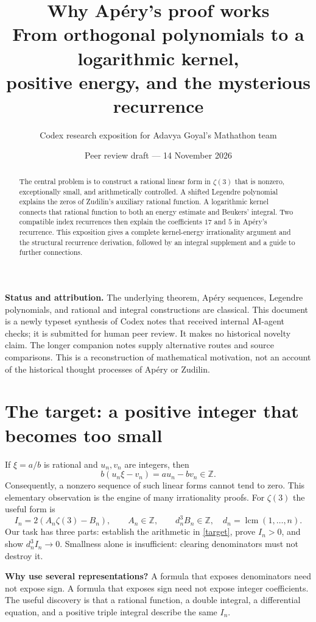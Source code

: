\documentclass[11pt]{article}
\title{Why Ap\'ery's proof works\\[3mm]\large From orthogonal polynomials to a logarithmic kernel,\\positive energy, and the mysterious recurrence}
\author{Codex research exposition for Adavya Goyal's Mathathon team}
\date{Peer review draft --- 14 November 2026}
\newcommand{\Z}{\mathbb Z}
\DeclareMathOperator{\lcm}{lcm}
\begin{document}
\maketitle
\begin{abstract}
The central problem is to construct a rational linear form in $\zeta(3)$ that is nonzero, exceptionally small, and arithmetically controlled. A shifted Legendre polynomial explains the zeros of Zudilin's auxiliary rational function. A logarithmic kernel connects that rational function to both an energy estimate and Beukers' integral. Two compatible index recurrences then explain the coefficients $17$ and $5$ in Ap\'ery's recurrence. This exposition gives a complete kernel-energy irrationality argument and the structural recurrence derivation, followed by an integral supplement and a guide to further connections.
\end{abstract}
\noindent\textbf{Status and attribution.} The underlying theorem, Ap\'ery sequences, Legendre polynomials, and rational and integral constructions are classical. This document is a newly typeset synthesis of Codex notes that received internal AI-agent checks; it is submitted for human peer review. It makes no historical novelty claim. The longer companion notes supply alternative routes and source comparisons. This is a reconstruction of mathematical motivation, not an account of the historical thought processes of Ap\'ery or Zudilin.
{\small\setcounter{tocdepth}{1}\tableofcontents}
\newpage
\section{The target: a positive integer that becomes too small}
If $\xi=a/b$ is rational and $u_n,v_n$ are integers, then
\[
 b(u_n\xi-v_n)=a u_n-bv_n\in\Z.
\]
Consequently, a nonzero sequence of such linear forms cannot tend to zero. This elementary observation is the engine of many irrationality proofs. For $\zeta(3)$ the useful form is
\begin{equation}\label{target}
 I_n=2(A_n\zeta(3)-B_n),\qquad A_n\in\Z,
 \qquad d_n^3B_n\in\Z,\quad d_n=\lcm(1,\ldots,n).
\end{equation}
Our task has three parts: establish the arithmetic in \eqref{target}, prove $I_n>0$, and show $d_n^3I_n\to0$. Smallness alone is insufficient: clearing denominators must not destroy it.

\textbf{Why use several representations?} A formula that exposes denominators need not expose sign. A formula that exposes sign need not expose integer coefficients. The useful discovery is that a rational function, a double integral, a differential equation, and a positive triple integral describe the same $I_n$.
\end{document}
